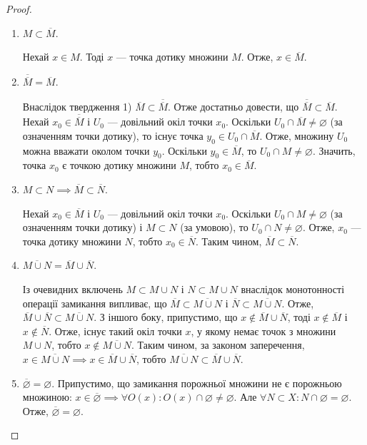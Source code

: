 \documentclass[a4paper, 12pt]{article}
\newcommand{\nothing}{$\left.\right.$}
\renewcommand{\emptyset}{\varnothing}
\begin{document}
\begin{proof}
	\nothing
	\begin{enumerate}
		\item $M \subset \overline{M}$. \smallskip

		Нехай $x \in M$. Тоді $x$ --- точка дотику множини $M$. Отже,
		$x \in \overline{M}$.

		\item $\overline{\overline{M}} = \overline{M}$. \smallskip

		Внаслідок твердження 1) $\overline{M} \subset \overline{\overline{M}}$. Отже достатньо
		довести, що $\overline{\overline{M}} \subset \overline{M}$. Нехай $x_0 \in \overline{\overline{M}}$ і $U_0$ --- довільний окіл
		точки $x_0$. Оскільки $U_0 \cap \overline{M} \ne \emptyset$ (за означенням точки
		дотику), то існує точка $y_0 \in U_0 \cap \overline{M}$. Отже, множину $U_0$
		можна вважати околом точки $y_0$. Оскільки $y_0 \in \overline{M}$, то
		$U_0 \cap M \ne \emptyset$. Значить, точка $x_0$ є точкою дотику
		множини $M$, тобто $x_0 \in \overline{M}$.

		\item $M \subset N \implies \overline{M} \subset \overline{N}$. \smallskip

		Нехай $x_0 \in \overline{M}$ і $U_0$ --- довільний окіл точки $x_0$. Оскільки
		$U_0 \cap M \ne \emptyset$ (за означенням точки дотику) і $M \subset N$ (за
		умовою), то $U_0 \cap N \ne \emptyset$. Отже, $x_0$ --- точка дотику
		множини $N$, тобто $x_0 \in \overline{N}$. Таким чином, $\overline{M} \subset \overline{N}$.

		\item $\overline{M \cup N} = \overline{M} \cup \overline{N}$. \smallskip

		Із очевидних включень $M \subset M \cup N$ і $N \subset M \cup N$
		внаслідок монотонності операції замикання випливає, що
		$\overline{M} \subset \overline{M \cup N}$ і $\overline{N} \subset \overline{M \cup N}$. Отже, $\overline{M} \cup \overline{N} \subset \overline{M \cup N}$. З іншого
		боку, припустимо, що $x \notin \overline{M} \cup \overline{N}$, тоді $x \notin \overline{M}$ і $x \notin \overline{N}$. Отже,
		існує такий окіл точки $x$, у якому немає точок з множини
		$M \cup N$, тобто $x \notin \overline{M \cup N}$. Таким чином, за законом
		заперечення, $x \in \overline{M \cup N} \implies x \in \overline{M} \cup \overline{N}$, тобто
		$\overline{M \cup N} \subset \overline{M} \cup \overline{N}$.
		
		\item $\overline{\emptyset} = \emptyset$.
		Припустимо, що замикання порожньої множини не є
		порожньою множиною: $x \in \overline{\emptyset} \implies \forall O(x): O(x) \cap \emptyset \ne \emptyset$. Але
		$\forall N \subset X: N \cap \emptyset = \emptyset$. Отже, $\overline{\emptyset} = \emptyset$.
	\end{enumerate}
\end{proof}
\end{document}
